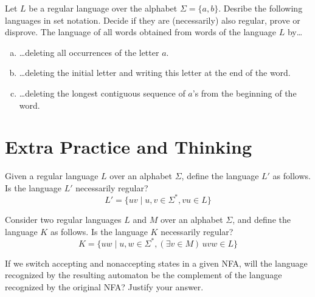 \documentclass[a4paper,12pt]{amsart}
\begin{document}
\medskip\begin{problem}[Delete]
    
    Let $L$ be a regular language over the alphabet $\Sigma=\{a,b\}$. Desribe the following languages in set notation. Decide if they are (necessarily) also regular, prove or disprove.    
    The language of all words obtained from words of the language $L$ by\dots

    \medskip

    \begin{enumerate}[(a)]\setlength\itemsep{6pt} 
        \item \dots deleting all occurrences of the letter $a$. 
        \item \dots deleting the initial letter and writing this letter at the end of the word. 
        \item \dots deleting the longest contiguous sequence of $a$'s from the beginning of the word.
    \end{enumerate}

\end{problem}


\section*{Extra Practice and Thinking}


\medskip\begin{problem}[Shift] 
    Given a regular language $L$ over an alphabet $\Sigma$, define the language $L'$ as follows. Is the language $L'$ necessarily regular? 
    $$
    L'=\{uv\mid u,v\in\Sigma^*,vu\in L\}
    $$ 
\end{problem}  

\medskip\begin{problem}[Cut] 
    Consider two regular languages $L$ and $M$ over an alphabet $\Sigma$, and define the language $K$ as follows. Is the language $K$ necessarily regular? 
    $$  
    K=\{uw\mid u,w\in\Sigma^*, (\exists v\in M)\, uvw\in L\}  
    $$
\end{problem}  


\medskip\begin{problem}
    
    If we switch accepting and nonaccepting states in a given NFA, will the language recognized by the resulting automaton be the complement of the language recognized by the original NFA? Justify your answer.

\end{problem}
   
\end{document}
